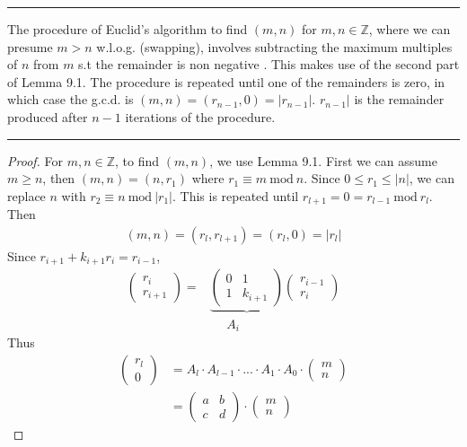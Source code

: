 \documentclass{article}
\theoremstyle{definition}
\theoremstyle{remark}
\begin{document}
\hrule
\vspace{2mm}
The procedure of Euclid's algorithm to find $(m,n)$ for $m,n\in\mathbb{Z}$, where we can presume $m>n$ w.l.o.g. (swapping), involves subtracting the maximum multiples of $n$ from $m$ s.t the remainder is non negative . This makes use of the second part of Lemma 9.1. The procedure is repeated until one of the remainders is zero, in which case the g.c.d. is $(m,n)=(r_{n-1},0)=|r_{n-1}|$. $r_{n-1}|$ is the remainder produced after $n-1$ iterations of the procedure.\\
\hrule
\begin{proof}
For $m,n\in\mathbb{Z}$, to find $(m,n)$, we use Lemma 9.1. First we can assume $m\geq n$, then $(m,n)=(n,r_1)$ where $r_1\equiv m~\mathrm{mod}~n$. Since $0\leq r_1\leq |n|$, we can replace $n$ with $r_2\equiv n~\mathrm{mod}~|r_1|$. This is repeated until $r_{l+1}=0=r_{l-1}~\mathrm{mod}~r_l$. Then
\begin{align*}
(m,n)=(r_l,r_{l+1})=(r_l,0)=|r_l|
\end{align*}
Since $r_{i+1}+k_{i+1}r_i=r_{i-1}$,
\begin{align*}
\begin{pmatrix}
	r_i\\
	r_{i+1}
\end{pmatrix}
=
&\underbrace{\begin{pmatrix}
	0&1\\
	1&k_{i+1}
\end{pmatrix}}
\begin{pmatrix}
r_{i-1}\\
r_i
\end{pmatrix}\\
&~~~~~~A_i
\end{align*}
Thus
\begin{align*}
\begin{pmatrix}
r_l\\0
\end{pmatrix}
&=A_l\cdot A_{l-1}\cdot...\cdot A_1\cdot A_0\cdot\begin{pmatrix}
m\\n
\end{pmatrix}\\
&=\begin{pmatrix}
a&b\\
c&d
\end{pmatrix}
\cdot \begin{pmatrix}
m\\n
\end{pmatrix}
\end{align*}
\end{proof}
\newpage
\end{document}
